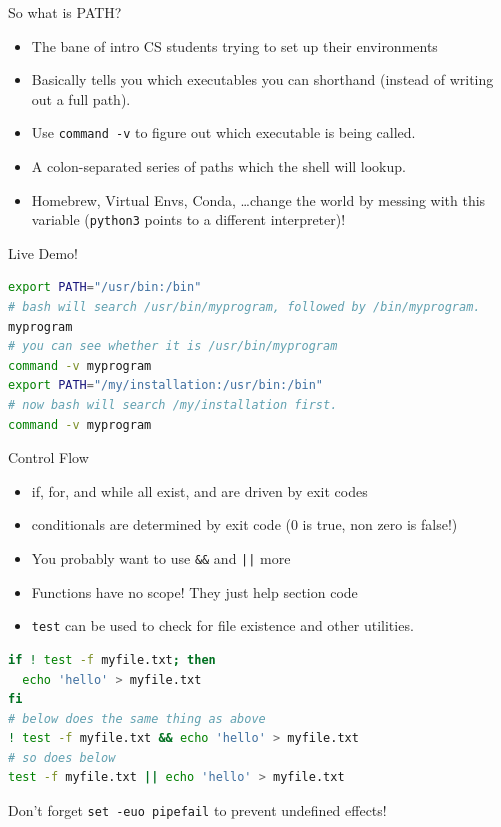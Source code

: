 \documentclass{../lecture}
\begin{document}
\begin{frame}[fragile]{So what is PATH?}
  \begin{itemize}
    \item The bane of intro CS students trying to set up their environments
    \item Basically tells you which executables you can shorthand (instead of
      writing out a full path).
    \item Use \texttt{command -v} to figure out which executable is being
      called.
    \item A colon-separated series of paths which the shell will lookup.
    \item Homebrew, Virtual Envs, Conda, \dots change the world by messing with
      this variable (\texttt{python3} points to a different interpreter)!
  \end{itemize}
Live Demo!
\begin{lstlisting}[language=bash]
export PATH="/usr/bin:/bin"
# bash will search /usr/bin/myprogram, followed by /bin/myprogram.
myprogram
# you can see whether it is /usr/bin/myprogram
command -v myprogram
export PATH="/my/installation:/usr/bin:/bin"
# now bash will search /my/installation first.
command -v myprogram
\end{lstlisting}
\end{frame}

\begin{frame}[fragile]{Control Flow}
  \begin{itemize}
    \item if, for, and while all exist, and are driven by exit codes
    \item conditionals are determined by exit code (0 is true, non zero is false!)
    \item You probably want to use \texttt{\&\&} and \texttt{||} more
    \item Functions have no scope! They just help section code
    \item \texttt{test} can be used to check for file existence and other utilities.
  \end{itemize}
\begin{lstlisting}[language=bash]
if ! test -f myfile.txt; then
  echo 'hello' > myfile.txt
fi
# below does the same thing as above
! test -f myfile.txt && echo 'hello' > myfile.txt
# so does below
test -f myfile.txt || echo 'hello' > myfile.txt
\end{lstlisting}

Don't forget \texttt{set -euo pipefail} to prevent undefined effects!
\end{frame}
\end{document}

